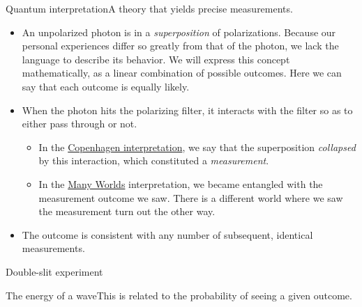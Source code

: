 \begin{frame}{Quantum interpretation}{A theory that yields precise measurements.}
\begin{itemize}
    \item An unpolarized photon is in a \emph{superposition} of polarizations.  Because our personal experiences differ so greatly from that of the photon, we lack the language to describe its behavior.  We will express this concept mathematically, as a linear combination of possible outcomes.  Here we can say that each outcome is equally likely.
    \item When the photon hits the polarizing filter, it interacts with the filter so as to either pass through or not.
    \begin{itemize}
        \item In the \href{https://en.wikipedia.org/wiki/Copenhagen_interpretation}{Copenhagen interpretation}, we say that the superposition \emph{collapsed} by this interaction, which constituted a \emph{measurement}.
        \item In the \href{https://en.wikipedia.org/wiki/Many-worlds_interpretation}{Many Worlds} interpretation, we became entangled with the measurement outcome we saw.  There is a different world where we saw the measurement turn out the other way.
    \end{itemize}
    \item The outcome is consistent with any number of subsequent, identical measurements.
    
\end{itemize}
\end{frame}

\begin{frame}{Double-slit experiment}
\end{frame}

\begin{frame}{The energy of a wave}{This is related to the probability of seeing a given outcome.}
\end{frame}